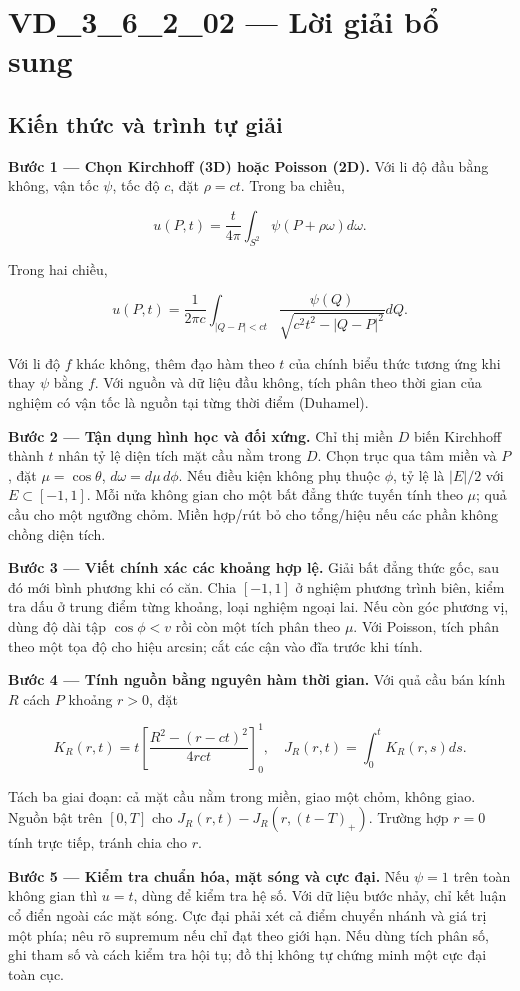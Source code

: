 \documentclass[10pt,a4paper]{article}
\begin{document}
\section*{VD\_3\_6\_2\_02 — Lời giải bổ sung}
\subsection*{Kiến thức và trình tự giải}
\textbf{Bước 1 — Chọn Kirchhoff (3D) hoặc Poisson (2D).} Với li độ đầu bằng không, vận tốc $\psi$, tốc độ $c$, đặt $\rho=ct$. Trong ba chiều,


\[
u(P,t)=\frac t{4\pi}\int_{S^2}\psi(P+\rho\omega)d\omega.
\]


Trong hai chiều,


\[
u(P,t)=\frac1{2\pi c}\int_{|Q-P|<ct}\frac{\psi(Q)}{\sqrt{c^2t^2-|Q-P|^2}}dQ.
\]


Với li độ $f$ khác không, thêm đạo hàm theo $t$ của chính biểu thức tương ứng khi thay $\psi$ bằng $f$. Với nguồn và dữ liệu đầu không, tích phân theo thời gian của nghiệm có vận tốc là nguồn tại từng thời điểm (Duhamel).

\textbf{Bước 2 — Tận dụng hình học và đối xứng.} Chỉ thị miền $D$ biến Kirchhoff thành $t$ nhân tỷ lệ diện tích mặt cầu nằm trong $D$. Chọn trục qua tâm miền và $P$, đặt $\mu=\cos\theta$, $d\omega=d\mu\,d\phi$. Nếu điều kiện không phụ thuộc $\phi$, tỷ lệ là $|E|/2$ với $E\subset[-1,1]$. Mỗi nửa không gian cho một bất đẳng thức tuyến tính theo $\mu$; quả cầu cho một ngưỡng chỏm. Miền hợp/rút bỏ cho tổng/hiệu nếu các phần không chồng diện tích.

\textbf{Bước 3 — Viết chính xác các khoảng hợp lệ.} Giải bất đẳng thức gốc, sau đó mới bình phương khi có căn. Chia $[-1,1]$ ở nghiệm phương trình biên, kiểm tra dấu ở trung điểm từng khoảng, loại nghiệm ngoại lai. Nếu còn góc phương vị, dùng độ dài tập $\cos\phi<v$ rồi còn một tích phân theo $\mu$. Với Poisson, tích phân theo một tọa độ cho hiệu arcsin; cắt các cận vào đĩa trước khi tính.

\textbf{Bước 4 — Tính nguồn bằng nguyên hàm thời gian.} Với quả cầu bán kính $R$ cách $P$ khoảng $r>0$, đặt


\[
K_R(r,t)=t\left[\frac{R^2-(r-ct)^2}{4rct}\right]_0^1,\quad J_R(r,t)=\int_0^tK_R(r,s)ds.
\]


Tách ba giai đoạn: cả mặt cầu nằm trong miền, giao một chỏm, không giao. Nguồn bật trên $[0,T]$ cho $J_R(r,t)-J_R(r,(t-T)_+)$. Trường hợp $r=0$ tính trực tiếp, tránh chia cho $r$.

\textbf{Bước 5 — Kiểm tra chuẩn hóa, mặt sóng và cực đại.} Nếu $\psi=1$ trên toàn không gian thì $u=t$, dùng để kiểm tra hệ số. Với dữ liệu bước nhảy, chỉ kết luận cổ điển ngoài các mặt sóng. Cực đại phải xét cả điểm chuyển nhánh và giá trị một phía; nêu rõ supremum nếu chỉ đạt theo giới hạn. Nếu dùng tích phân số, ghi tham số và cách kiểm tra hội tụ; đồ thị không tự chứng minh một cực đại toàn cục.
\end{document}
